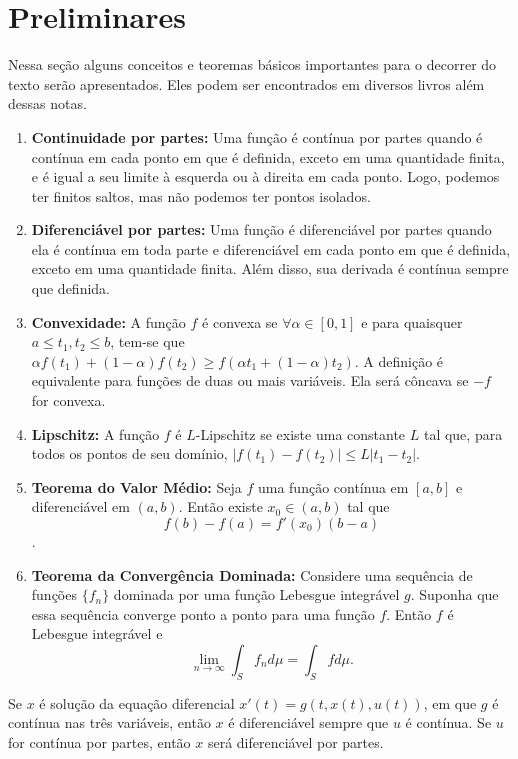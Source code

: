 \section{Preliminares}


Nessa seção alguns conceitos e teoremas básicos importantes para o decorrer
do texto serão apresentados. Eles podem ser encontrados em diversos livros
além dessas notas. 

\begin{enumerate}
    \item \label{piecewise-continuous} \textbf{Continuidade por partes:} Uma
    função é contínua por partes quando é contínua em cada
    ponto em que é definida, exceto em uma quantidade finita, e é igual a
    seu limite à esquerda ou à direita em cada ponto. Logo, podemos ter
    finitos saltos, mas não podemos ter pontos isolados. 
    \item \textbf{Diferenciável por partes:} Uma função é diferenciável por
    partes quando ela é contínua em toda parte e diferenciável em cada ponto
    em que é definida, exceto em uma quantidade finita. Além disso, sua derivada é contínua sempre que definida. 
    \item \textbf{Convexidade:} A função $f$ é convexa se $\forall \alpha \in
    [0,1]$ e para quaisquer $a \leq t_1,t_2 \leq b$, tem-se que $\alpha f(t_1)
    + (1 - \alpha)f(t_2) \geq f(\alpha t_1 + (1 - \alpha)t_2)$. A definição é
    equivalente para funções de duas ou mais variáveis. Ela será côncava se
    $-f$ for convexa. 
    \item \textbf{Lipschitz:} A função $f$ é $L$-Lipschitz se existe uma
    constante $L$ tal que, para todos os pontos de seu domínio, $|f(t_1) - f(t_2)| \leq L|t_1 - t_2|$.
    \item \textbf{Teorema do Valor Médio:} Seja $f$ uma função contínua em
    $[a,b]$ e diferenciável em $(a,b)$. Então existe $x_0 \in (a,b)$ tal que
    $$f(b) - f(a) = f'(x_0)(b - a)$$. 
    \item \label{dominated-convergence} \textbf{Teorema da Convergência
    Dominada:} Considere uma sequência de funções 
    $\{f_n\}$ dominada por uma função Lebesgue integrável $g$. Suponha que
    essa sequência converge ponto a ponto para uma função $f$. Então $f$ é
    Lebesgue integrável e 
    $$\lim_{n \to \infty} \int_S f_n d\mu = \int_S f d\mu.$$
\end{enumerate}

\begin{remark}
    Se $x$ é solução da equação diferencial $x'(t) = g(t, x(t), u(t))$, em que
    $g$ é contínua nas três variáveis, então $x$ é diferenciável sempre que
    $u$ é contínua. Se $u$ for contínua por partes, então $x$ será
    diferenciável por partes. 
\end{remark}

